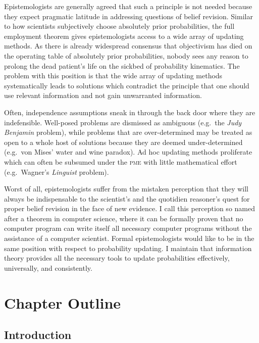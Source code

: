 \documentclass[11pt]{article}
\begin{document}
Epistemologists are generally agreed that such a principle is not
needed because they expect pragmatic latitude in addressing questions
of belief revision. Similar to how scientists subjectively choose
absolutely prior probabilities, the full employment theorem gives
epistemologists access to a wide array of updating methods. As
there is already widespread consensus that objectivism has died on the
operating table of absolutely prior probabilities, nobody sees any
reason to prolong the dead patient's life on the sickbed of
probability kinematics. The problem with this position is that the
wide array of updating methods systematically leads to solutions which
contradict the principle that one should use relevant information and
not gain unwarranted information. 

Often, independence assumptions sneak in through the back door where
they are indefensible. Well-posed problems are dismissed as ambiguous
(e.g.\ the \emph{Judy Benjamin} problem), while problems that are
over-determined may be treated as open to a whole host of solutions
because they are deemed under-determined (e.g.\ von Mises' water and
wine paradox). Ad hoc updating methods proliferate which can often be
subsumed under the \textsc{pme} with little mathematical effort (e.g.\
Wagner's \emph{Linguist} problem). 

Worst of all, epistemologists suffer from the mistaken perception that
they will always be indispensable to the scientist's and the quotidien
reasoner's quest for proper belief revision in the face of new
evidence. I call this perception  so named
after a theorem in computer science, where it can be formally proven
that no computer program can write itself all necessary computer
programs without the assistance of a computer scientist. Formal
epistemologists would like to be in the same position with respect to
probability updating. I maintain that information theory provides all
the necessary tools to update probabilities effectively, universally,
and consistently.

\section{Chapter Outline}
\label{ChapterOutline}

\subsection{Introduction}
\label{Introduction}
\end{document}
